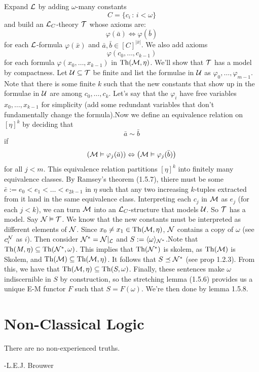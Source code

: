 \documentclass{article}
\numberwithin{thm}{subsection}
\begin{document}
Expand $\mathcal{L}$ by adding $\omega$-many constants \[ C = \{ c_{i} \, : \, i< \omega\}\] and build an $\mathcal{L}_{C}$-theory $\mathcal{T}$ whose axioms are: \[ \varphi(\bar a) \Leftrightarrow \varphi(\bar b)\] for each $\mathcal{L}$-formula $\varphi(\bar x)$ and $\bar a, \bar b \in [C]^{|\bar x |}$. \gap We also add axioms \[ \varphi(c_{0},\dots, c_{k-1})\] for each formula $\varphi(x_{0},\dots, x_{k-1})$ in $\operatorname{Th}(\mathcal{M}, \eta)$. We'll show that $\mathcal{T}$ has a model by compactness. \gap Let $\mathcal{U} \subseteq \mathcal{T}$ be finite and list the formulae in $\mathcal{U}$ as $\varphi_{0}, \dots, \varphi_{m-1}$. Note that there is some finite $k$ such that the new constants that show up in the formulae in $\mathcal{U}$ are among $c_{0}, \dots, c_{k}$. Let's say that the $\varphi_{i}$ have free variables $x_{0}, \dots, x_{k-1}$ for simplicity (add some redundant variables that don't fundamentally change the formula).\gap Now we define an equivalence relation on $[\eta]^{k}$ by deciding that \[\bar a \sim \bar b\] if \[\left(\mathcal{M} \vDash \varphi_{j}(\bar a) \right)\Leftrightarrow \left( \mathcal{M} \vDash \varphi_{j}(\bar b)\right)\] for all $j<m$. \gap This equivalence relation partitions $[\eta]^{k}$ into finitely many equivalence classes. By Ramsey's theorem (1.5.7), thiere must be some $\bar e := e_{0}<e_{1}<\dots<e_{2k-1}$ in $\eta$ such that any two increasing $k$-tuples extracted from it land in the same equivalence class. \gap Interpreting each $c_{j}$ in $\mathcal{M}$ as $e_{j}$ (for each $j<k$), we can turn $\mathcal{M}$ into an $\mathcal{L}_{C}$-structure that models $\mathcal{U}$. So $\mathcal{T}$ has a model. \gap Say $\mathcal{N} \vDash \mathcal{T}$. We know that the new constants must be interpreted as different elements of $\mathcal{N}$. Since $x_{0} \neq x_{1} \in \operatorname{Th}(\mathcal{M}, \eta)$, $\mathcal{N}$ contains a copy of $\omega$ (see $c_{i}^{\mathcal{N}}$ as $i$). Then consider $\mathcal{N}^{*} = \mathcal{N}|_{\mathcal{L}}$ and $S:= \langle \omega \rangle_{\mathcal{N}^{*}}$.\gap Note that $\operatorname{Th}(M, \eta) \subseteq \operatorname{Th}(\mathcal{N}^{*}, \omega)$. This implies that $\operatorname{Th}(\mathcal{N}^{*})$ is skolem, as $\operatorname{Th}(\mathcal{M})$ is Skolem, and $\operatorname{Th}(\mathcal{M}) \subseteq \operatorname{Th}(\mathcal{M}, \eta)$. It follows that $S \preceq \mathcal{N}^{*}$ (see prop 1.2.3). \gap 
From this, we have that $\operatorname{Th}(\mathcal{M}, \eta) \subseteq \operatorname{Th}(S,\omega)$. Finally, these sentences make $\omega$ indiscernible in $S$ by construction, so the stretching lemma (1.5.6) provides us a unique E-M functor $F$ such that $S=F(\omega)$. We're then done by lemma 1.5.8. \endproof
\section{Non-Classical Logic}
\begin{displayquote}
    There are no non-experienced truths.
\end{displayquote}
-L.E.J. Brouwer
\end{document}
